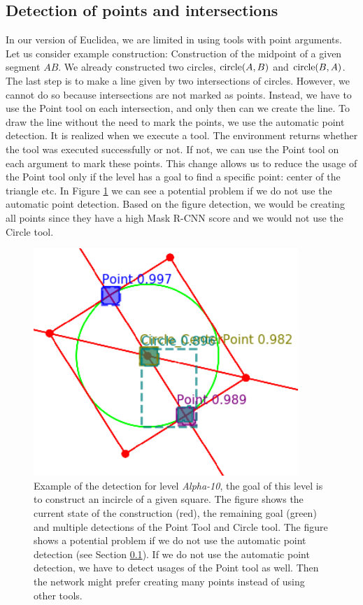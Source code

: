 \subsection{Detection of points and intersections}
\label{no_point_detection}
In our version of Euclidea, we are limited in using tools with point arguments. Let us consider example construction: Construction of the midpoint of a given segment $AB$. We already constructed two circles, $\operatorname{circle}(A, B)$ and $\operatorname{circle}(B, A)$. The last step is to make a line given by two intersections of circles.  However, we cannot do so because intersections are not marked as points. Instead, we have to use the Point tool on each intersection, and only then can we create the line. To draw the line without the need to mark the points, we use the automatic point detection. It is realized when we execute a tool. The environment returns whether the tool was executed successfully or not. If not, we can use the Point tool on each argument to mark these points. This change allows us to reduce the usage of the Point tool only if the level has a goal to find a specific point: center of the triangle etc. 
\newline \newline
In Figure \ref{no_point_detection_img} we can see a potential problem if we do not use the automatic point detection. Based on the figure detection, we would be creating all points since they have a high Mask {R-CNN} score and we would not use the Circle tool.
\begin{figure}[t]
\centering
\includegraphics[width=100mm]{img/NO_POINT_DETECTION.png}
\caption{Example of the detection for level \textit{Alpha-10}, the goal of this level is to construct an incircle of a given square. The figure shows the current state of the construction (red), the remaining goal (green) and multiple detections of the Point Tool and Circle tool. The figure shows a potential problem if we do not use the automatic point detection (see Section \ref{no_point_detection}). If we do not use the automatic point detection, we have to detect usages of the Point tool as well. Then the network might prefer creating many points instead of using other tools.}
\label{no_point_detection_img}
\end{figure}

